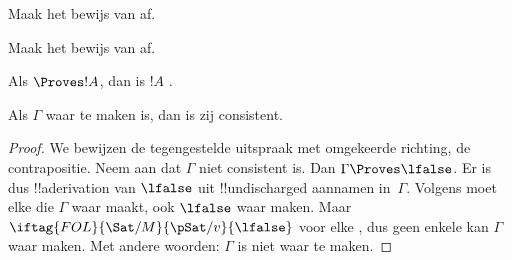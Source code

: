 \documentclass[../../../include/open-logic-section]{subfiles}
\begin{document}
\begin{prob}
Maak het bewijs van  af.
\end{prob}
\tagendprob

\begin{prob}
Maak het bewijs van  af.
\end{prob}
\tagendprob

\begin{cor}
Als $\Proves !A$, dan is $!A$
.
\end{cor}

\begin{cor}
Als $\Gamma$ waar te maken is, dan is zij consistent.
\end{cor}

\begin{proof}
We bewijzen de tegengestelde uitspraak met omgekeerde richting, de
contrapositie. Neem aan dat $\Gamma$ niet consistent is. Dan
$\Gamma \Proves \lfalse$. Er is dus !!a{derivation} van $\lfalse$ uit
!!{undischarged} aannamen in~$\Gamma$. Volgens
 moet elke
die $\Gamma$ waar maakt, ook $\lfalse$ waar maken. Maar
$\iftag{FOL}{\Sat/{M}}{\pSat/{v}}{\lfalse}$ voor elke
,
dus geen enkele  kan
$\Gamma$ waar maken. Met andere woorden: $\Gamma$ is niet waar te
maken.
\end{proof}
\end{document}
